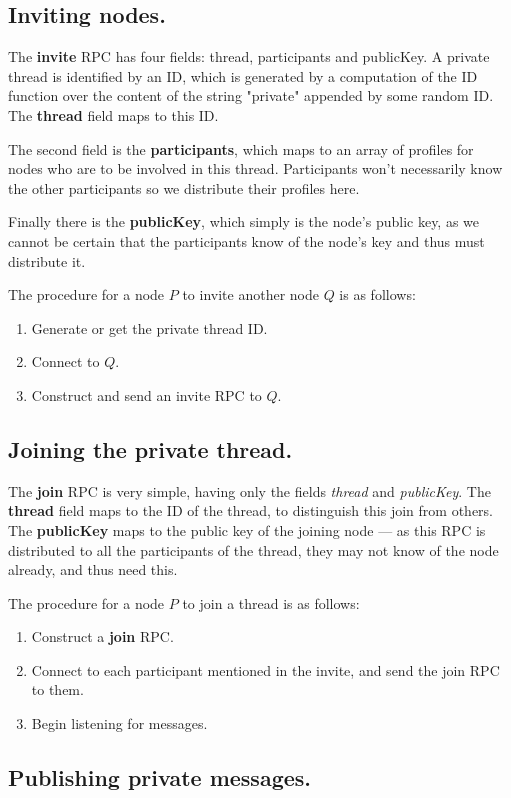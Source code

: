 \documentclass[10pt,a4paper,onecolumn]{article}
\begin{document}
\subsection*{Inviting nodes.}
The \textbf{invite} RPC has four fields: thread, participants and publicKey. A private thread is identified by an ID, which is generated by a computation of the ID function over the content of the string "private" appended by some random ID. The \textbf{thread} field maps to this ID. 

The second field is the \textbf{participants}, which maps to an array of profiles for nodes who are to be involved in this thread. Participants won't necessarily know the other participants so we distribute their profiles here. 

Finally there is the \textbf{publicKey}, which simply is the node's public key, as we cannot be certain that the participants know of the node's key and thus must distribute it.

The procedure for a node $P$ to invite another node $Q$ is as follows:
\begin{enumerate}
\item Generate or get the private thread ID. 
\item Connect to $Q$.
\item Construct and send an invite RPC to $Q$.
\end{enumerate}

\subsection*{Joining the private thread.}
The \textbf{join} RPC is very simple, having only the fields \textit{thread} and \textit{publicKey}. The \textbf{thread} field maps to the ID of the thread, to distinguish this join from others. The \textbf{publicKey} maps to the public key of the joining node — as this RPC is distributed to all the participants of the thread, they may not know of the node already, and thus need this. 

The procedure for a node $P$ to join a thread is as follows:
\begin{enumerate}
\item Construct a \textbf{join} RPC.
\item Connect to each participant mentioned in the invite, and send the join RPC to them.
\item Begin listening for messages.
\end{enumerate}

\subsection*{Publishing private messages.}
\end{document}
